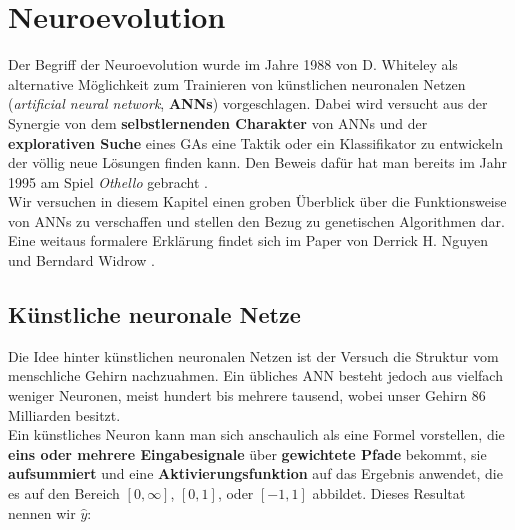     \section{Neuroevolution} \label{neural-evo-definition}
        Der Begriff der Neuroevolution wurde im Jahre 1988 von D. Whiteley \cite{whiteley88} als alternative Möglichkeit zum Trainieren von künstlichen neuronalen Netzen (\textit{artificial neural network}, \textbf{ANNs}) vorgeschlagen. Dabei wird versucht aus der Synergie von dem \textbf{selbstlernenden Charakter} von ANNs und der \textbf{explorativen Suche} eines GAs eine Taktik oder ein Klassifikator zu entwickeln der völlig neue Lösungen finden kann. Den Beweis dafür hat man bereits im Jahr 1995 am Spiel \textit{Othello} gebracht \cite{othello95}. \\[2mm]
        \noindent
        Wir versuchen in diesem Kapitel einen groben Überblick über die Funktionsweise von ANNs zu verschaffen und stellen den Bezug zu genetischen Algorithmen dar. Eine weitaus formalere Erklärung findet sich im Paper von Derrick H. Nguyen und Berndard Widrow \cite{neuralnetwork-overview}.

        \subsection{Künstliche neuronale Netze}

            Die Idee hinter künstlichen neuronalen Netzen ist der Versuch die Struktur vom menschliche Gehirn nachzuahmen. Ein übliches ANN besteht jedoch aus vielfach weniger Neuronen, meist hundert bis mehrere tausend, wobei unser Gehirn 86 Milliarden\cite{brainsize} besitzt.\\
            \noindent
            Ein künstliches Neuron kann man sich anschaulich als eine Formel vorstellen, die \textbf{eins oder mehrere Eingabesignale} über \textbf{gewichtete Pfade} bekommt, sie \textbf{aufsummiert} und eine \textbf{Aktivierungsfunktion} auf das Ergebnis anwendet, die es auf den Bereich $[0,\infty]$, $[0,1]$, oder $[-1,1]$ abbildet. Dieses Resultat nennen wir $\hat{y}$:

